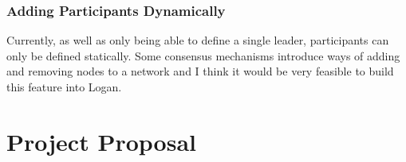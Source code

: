 \documentclass[12pt,a4paper,twoside,openright]{report}
\begin{document}
	\subsection{Adding Participants Dynamically}
	Currently, as well as only being able to define a single leader, participants can only be defined statically. 
	Some consensus mechanisms introduce ways of adding and removing nodes to a network and I think it would be very feasible to build this feature into Logan.

	
	
	
	\appendix

	\chapter{Project Proposal}
	
	
	
	
\end{document}
